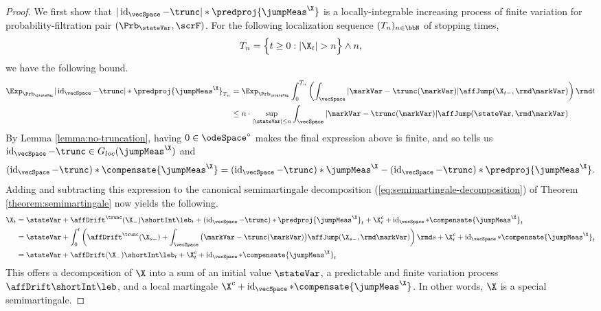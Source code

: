 \begin{proof}
  \label{proof:theorem:jump-diffusion}
  We first show that $|\operatorname{id}_\vecSpace - \trunc| \ast \predproj{\jumpMeas^\X}$ is a locally-integrable increasing process of finite variation for probability-filtration pair $(\Prb_\stateVar,\scrF)$.
  For the following localization sequence $(T_n)_{n\in\bbN}$ of stopping times,
  \begin{equation}
    T_n = \Big\{ t \geq 0 : |\X_t| > n \Big\} \wedge n,
  \end{equation}
  we have the following bound.
  \begin{align}
    \Exp_{\Prb_\stateVar} |\operatorname{id}_\vecSpace - \trunc | \ast \predproj{\jumpMeas^\X}_{T_n}
    &= \Exp_{\Prb_\stateVar} \int_0^{T_n} \left( \int_\vecSpace |\markVar - \trunc(\markVar)| \affJump(\X_{t-}, \rmd\markVar) \right) \rmd t \\
    &\leq n \cdot \sup_{|\stateVar| \leq n}\int_\vecSpace |\markVar-\trunc(\markVar)| \affJump(\stateVar, \rmd\markVar)
  \end{align}
  By Lemma \ref{lemma:no-truncation}, having $0 \in \odeSpace^\circ$ makes the final expression above is finite, and so \cite[Proposition II.1.28]{jacod2003} tells us $\operatorname{id}_\vecSpace - \trunc \in G_{loc}(\jumpMeas^\X)$ and
  \begin{equation}
    (\operatorname{id}_\vecSpace - \trunc) \ast \compensate{\jumpMeas^\X} = 
    (\operatorname{id}_\vecSpace - \trunc) \ast \jumpMeas^\X -
    (\operatorname{id}_\vecSpace - \trunc) \ast \predproj{\jumpMeas^\X}.
  \end{equation}
  Adding and subtracting this expression to the canonical semimartingale decomposition (\ref{eq:semimartingale-decomposition}) of Theorem \ref{theorem:semimartingale} now yields the following.
  \begin{align}
    \X_t
    &= \stateVar + \affDrift^\trunc(\X_-) \shortInt \leb_t + (\operatorname{id}_\vecSpace - \trunc) \ast \predproj{\jumpMeas^\X}_t + \X^c_t + \operatorname{id}_\vecSpace \ast \compensate{\jumpMeas^\X}_t \\
    &= \stateVar + \int_0^t \left( \affDrift^\trunc(\X_{s-}) + \int_\vecSpace \big(\markVar - \trunc(\markVar)\big) \affJump(\X_{s-}, \rmd\markVar) \right) \rmd s + \X^c_t + \operatorname{id}_\vecSpace \ast \compensate{\jumpMeas^\X}_t \\
    &= \stateVar + \affDrift(\X_-) \shortInt \leb_t + \X^c_t + \operatorname{id}_\vecSpace \ast \compensate{\jumpMeas^\X}_t
  \end{align}
  This offers a decomposition of $\X$ into a sum of an initial value $\stateVar$, a predictable and finite variation process $\affDrift \shortInt \leb$, and a local martingale $\X^c + \operatorname{id}_\vecSpace \ast \compensate{\jumpMeas^\X}$.
  In other words, $\X$ is a special semimartingale.


\end{proof}
